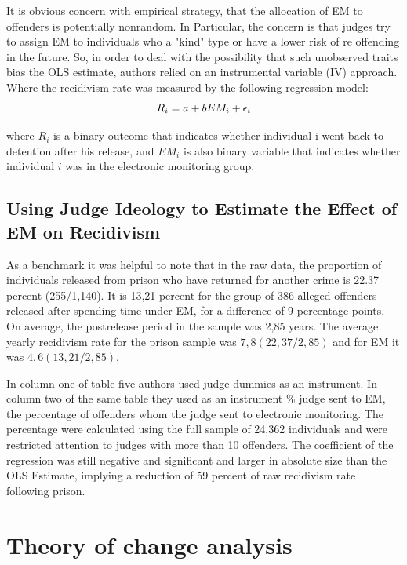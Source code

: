 \documentclass[a4paper,12pt]{article}
\begin{document}
It is obvious concern with empirical strategy, that the allocation of EM to offenders is potentially nonrandom. In Particular, the concern is that judges try to assign EM to individuals who a "kind" type or have a lower risk of re offending in the future. So, in order to deal with the possibility that such unobserved traits bias the OLS estimate, authors relied on an instrumental variable (IV) approach. Where the recidivism rate was measured by the following regression model: 
\begin{equation}
    \centering
    R_i = a + bEM_i + \epsilon_i  
\end{equation}

where $R_i$ is a binary outcome that indicates whether individual i went back to detention after his release, and $EM_i$ is also binary variable that indicates whether individual $i$ was in the electronic monitoring group. 


\subsection{Using Judge Ideology to Estimate the Effect of EM on Recidivism}
As a benchmark it was helpful to note that in the raw data, the proportion of individuals released from prison who have returned for another crime is 22.37 percent (255/1,140). It is 13,21 percent for the group of 386 alleged offenders released after spending time under EM, for a difference of 9 percentage points. On average, the postrelease period in the sample was 2,85 years. The average yearly recidivism rate for the prison sample was $7,8 (22,37/2,85)$ and for EM it was $4,6 (13,21/2,85)$. 

In column one of table five authors used judge dummies as an instrument. In column two of the same table they used as an instrument \% judge sent to EM, the percentage of offenders whom the judge sent to electronic monitoring. The percentage were calculated using the full sample of 24,362 individuals and were restricted attention to judges with more than 10 offenders. The coefficient of the regression was still negative and significant and larger in absolute size than the OLS Estimate, implying a reduction of 59 percent of raw recidivism rate following prison. 



\newpage
\section{Theory of change analysis}
\end{document}
